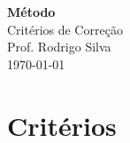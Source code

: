 \documentclass[12pt,a4paper, brazil]{article}
\begin{document}
\begin{center}
{\textbf {\huge Método}}\\[5mm]
{\large Critérios de Correção } \\[2mm]
{\large Prof. Rodrigo Silva } \\[5mm]
\today\\[5mm] %
\end{center}



\section*{Critérios}
\end{document}
